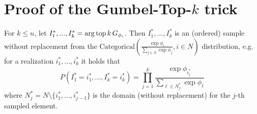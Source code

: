 \appendix
\section{Proof of the Gumbel-Top-$k$ trick}
\label{app:proof_gumbel_topk_trick}

\begingroup
\def\thetheorem{\ref{thm:gumbel_top_k}}
\begin{theorem}
For $k \le n$, let $I^*_1, ..., I^*_k = \operatorname*{arg\,top} k \,{ G_{\phi_i} }$. Then $I^*_1, ..., I^*_k$ is an (ordered) sample without replacement from the $\text{Categorical} \left( \frac{\exp{\phi_i}}{\sum_{j \in N} \exp{\phi_j}}, i \in N \right)$ distribution, e.g. for a realization $i^*_1, ..., i^*_k$ it holds that
\begin{equation}
\label{eq:theorem_topk_trick_app}
    P\left(I^*_1 = i^*_1, ..., I^*_k = i^*_k\right) = \prod_{j=1}^k \frac{\exp{\phi_{i^*_j}}}{\sum_{\ell \in N^*_j} \exp{\phi_\ell}}
\end{equation}
where $N^*_j = N \setminus \{i^*_1, ..., i^*_{j-1}\}$ is the domain (without replacement) for the $j$-th sampled element.
\end{theorem}
\addtocounter{theorem}{-1}
\endgroup

